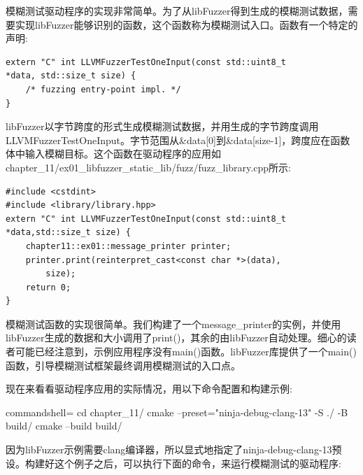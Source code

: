 模糊测试驱动程序的实现非常简单。为了从libFuzzer得到生成的模糊测试数据，需要实现libFuzzer能够识别的函数，这个函数称为模糊测试入口。函数有一个特定的声明:

\begin{lstlisting}[style=styleCXX]
extern "C" int LLVMFuzzerTestOneInput(const std::uint8_t
*data, std::size_t size) {
	/* fuzzing entry-point impl. */
}
\end{lstlisting}

libFuzzer以字节跨度的形式生成模糊测试数据，并用生成的字节跨度调用LLVMFuzzerTestOneInput。字节范围从\&data[0]到\&data[size-1]，跨度应在函数体中输入模糊目标。这个函数在驱动程序的应用如chapter\_11/ex01\_libfuzzer\_static\_lib/fuzz/fuzz\_library.cpp所示:

\begin{lstlisting}[style=styleCXX]
#include <cstdint>
#include <library/library.hpp>
extern "C" int LLVMFuzzerTestOneInput(const std::uint8_t
*data,std::size_t size) {
	chapter11::ex01::message_printer printer;
	printer.print(reinterpret_cast<const char *>(data),
		size);
	return 0;
}
\end{lstlisting}

模糊测试函数的实现很简单。我们构建了一个message\_printer的实例，并使用libFuzzer生成的数据和大小调用了print()，其余的由libFuzzer自动处理。细心的读者可能已经注意到，示例应用程序没有main()函数。libFuzzer库提供了一个main()函数，引导模糊测试框架最终调用模糊测试的入口点。

现在来看看驱动程序应用的实际情况，用以下命令配置和构建示例:

\begin{tcblisting}{commandshell={}}
cd chapter_11/
cmake --preset="ninja-debug-clang-13" -S ./ -B build/
cmake --build build/
\end{tcblisting}

因为libFuzzer示例需要clang编译器，所以显式地指定了ninja-debug-clang-13预设。构建好这个例子之后，可以执行下面的命令，来运行模糊测试的驱动程序:

